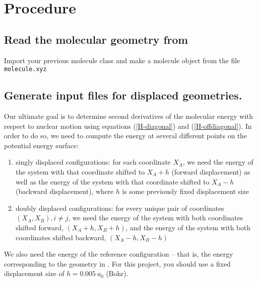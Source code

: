 \documentclass[11pt]{article}
\begin{document}
\newpage
\section{Procedure}
\subsection{Read the molecular geometry from }
Import your previous molecule class and make a molecule object from the file
\texttt{molecule.xyz}

\subsection{Generate input files for displaced geometries.}
Our ultimate goal is to determine second derivatives of the molecular energy
with respect to nuclear motion using equations (\ref{H-diagonal}) and
(\ref{H-offdiagonal}). In order to do so, we need to compute the energy at
several different points on the potential energy surface:
\begin{enumerate}
    \item singly displaced configurations: for each coordinate $X_A$, we need
the energy of the system with that coordinate shifted to $X_A+h$ (forward
displacement) as well as the energy of the system with that coordinate shifted
to $X_A-h$ (backward displacement), where $h$ is some previously fixed
displacement size
    \item doubly displaced configurations: for every unique pair of coordinates
$(X_A, X_B), i\neq j$, we need the energy of the system with both coordinates
shifted forward, $(X_A+h,X_B+h)$, and the energy of the system with both
coordinates shifted backward, $(X_A-h,X_B-h)$
\end{enumerate}
We also need the energy of the reference configuration -- that is, the energy
corresponding to the geometry in . For this project, you
should use a fixed displacement size of $h=0.005~a_0$ (Bohr).
\end{document}
